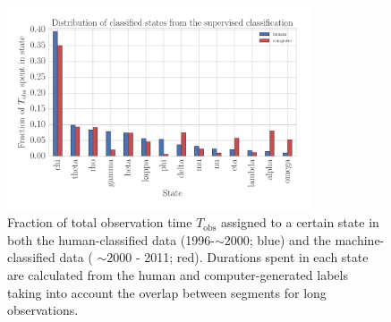 \documentclass[12pt]{emulateapj}
\begin{document}
\begin{figure}[htbp]
\begin{center}
\includegraphics[width=9cm]{grs1915_supervised_states_histogram.pdf}
\caption{Fraction of total observation time $T_\mathrm{obs}$ assigned to a certain state in both the human-classified data (1996-$\sim\!\! 2000$; blue) and the machine-classified data ( $\sim\!\! 2000$ - 2011; red). Durations spent in each state are calculated from the human and computer-generated labels taking into 
account the overlap between segments for long observations.} 
\label{fig:state_durations}
\end{center}
\end{figure}
\end{document}
